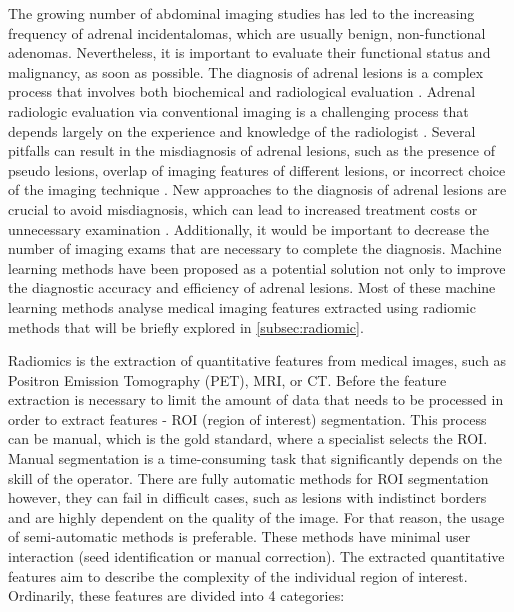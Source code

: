 \documentclass[11pt]{article}
\begin{document}

The growing number of abdominal imaging studies has led to the increasing
frequency of adrenal incidentalomas, which are usually benign, non-functional
adenomas. Nevertheless, it is important to evaluate their functional status and
malignancy, as soon as possible. The diagnosis of adrenal
lesions is a complex process that involves both biochemical and radiological
evaluation \cite{Anagnostis2009}. Adrenal radiologic evaluation via conventional
imaging is a challenging process that depends largely on the experience and
knowledge of the radiologist \cite{Zhang2022}. Several pitfalls can result in the
misdiagnosis of adrenal lesions, such as the presence of pseudo lesions, overlap
of imaging features of different lesions, or incorrect choice of the imaging
technique \cite{Elsayes2020}. New approaches to the diagnosis of adrenal lesions
are crucial to avoid misdiagnosis, which can lead to increased treatment costs
or unnecessary examination \cite{Zhang2022}. Additionally, it would be important
to decrease the number of imaging exams that are necessary to complete the
diagnosis. Machine learning methods have been proposed as a potential solution
not only to improve the diagnostic accuracy and efficiency of adrenal lesions. Most of these machine learning methods analyse medical
imaging features extracted using radiomic methods that will be briefly explored
in \ref{subsec:radiomic}.


Radiomics is the extraction of quantitative features from medical images, such
as Positron Emission Tomography (PET), MRI, or CT. Before the feature extraction
is necessary to limit the amount of data that needs to be processed in order to
extract features - ROI (region of interest) segmentation. This process can be manual, which is the gold
standard, where a specialist selects the ROI. Manual segmentation is a
time-consuming task that significantly depends on the skill of the operator.
There are fully automatic methods for ROI segmentation however, they can fail in
difficult cases, such as lesions with indistinct borders and are highly
dependent on the quality of the image. For that reason, the usage of
semi-automatic methods is preferable. These methods have minimal user
interaction (seed identification or manual correction). The extracted
quantitative features aim to describe the complexity of the individual region of
interest. Ordinarily, these features are divided into 4 categories:
\end{document}
